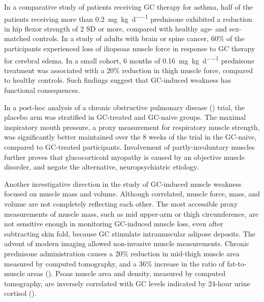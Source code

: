 \documentclass[12pt,english]{report}\usepackage[]{graphicx}\usepackage[]{color}
\begin{document}
In a comparative study of patients receiving GC therapy for asthma,
half of the patients receiving more than \SI{0.2}{\milli\gram\per\kilo\gram\per\day}
prednisone exhibited a reduction in hip flexor strength of 2 SD or
more, compared with healthy age- and sex-matched controls\citep{bowyer1985steroid}.
In a study of adults with brain or spine cancer, 60\% of the participants
experienced loss of iliopsoas muscle force in response to GC therapy
for cerebral edema\citep{batchelor1997steroid}. In a small cohort,
6 months of \SI{0.16}{\milli\gram\per\kilo\gram\per\day} prednisone
treatment was associated with a 20\% reduction in thigh muscle force,
compared to healthy controls\citep{horber1985thigh}. Such findings
suggest that GC-induced weakness has functional consequences.

In a post-hoc analysis of a chronic obstructive pulmonary disease
() trial,
the placebo arm was stratified in GC-treated and GC-naive groups\citep{pansters2013synergistic}.
The maximal inspiratory mouth pressure, a proxy measurement for respiratory
muscle strength, was significantly better maintained over the 8 weeks
of the trial in the GC-naive, compared to GC-treated participants.
Involvement of partly-involuntary muscles further proves that glucocorticoid
myopathy is caused by an objective muscle disorder, and negate the
alternative, neuropsychiatric etiology.

Another investigative direction in the study of GC-induced muscle
weakness focused on muscle mass and volume. Although correlated, muscle
force, mass, and volume are not completely reflecting each other.
The most accessible proxy measurements of muscle mass, such as mid
upper-arm or thigh circumference, are not sensitive enough in monitoring
GC-induced muscle loss, even after subtracting skin fold, because
GC stimulate intramuscular adipose deposits\citep{horber1987impact}.
The advent of modern imaging allowed non-invasive muscle measurements.
Chronic prednisone administration causes a 20\% reduction in mid-thigh
muscle area measured by computed tomography, and a 36\% increase in
the ratio of fat-to-muscle areas ()\citep{horber1985evidence}.
Psoas muscle area and density, measured by computed tomography, are
inversely correlated with GC levels indicated by 24-hour urine cortisol
()\citep{miller2011quantitative}.
\end{document}
